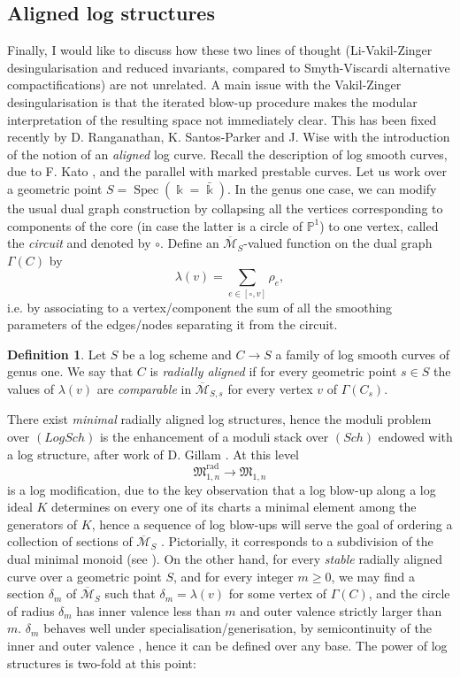 \documentclass[11pt]{amsart}
\newcommand{\oM}{\overline{\mathcal{M}}}
\newcommand{\PP}{\mathbb P}
\renewcommand{\to}{\rightarrow}
\newcommand{\MM}{\mathfrak M}
\newcommand{\kk}{\Bbbk}
\newcommand{\Spec}{\operatorname{Spec}}
\theoremstyle{definition}
\theoremstyle{definition}
\newtheorem{dfn}[thm]{Definition}
\begin{document}
\subsection{Aligned log structures} Finally, I would like to discuss how these two lines of thought (Li-Vakil-Zinger desingularisation and reduced invariants, compared to Smyth-Viscardi alternative compactifications) are not unrelated. A main issue with the Vakil-Zinger desingularisation is that the iterated blow-up procedure makes the modular interpretation of the resulting space not immediately clear. This has been fixed recently by D. Ranganathan, K. Santos-Parker and J. Wise with the introduction of the notion of an \emph{aligned} log curve. Recall the description of log smooth curves, due to F. Kato \cite{KatoF}, and the parallel with marked prestable curves. Let us work over a geometric point $S=\Spec(\kk=\bar\kk)$. In the genus one case, we can modify the usual dual graph construction by collapsing all the vertices corresponding to components of the core (in case the latter is a circle of $\PP^1$) to one vertex, called the \emph{circuit} and denoted by $\circ$. Define an $\oM_S$-valued function on the dual graph $\Gamma(C)$ by \[\lambda(v)=\sum_{e\in[\circ,v]}\rho_e,\] i.e. by associating to a vertex/component the sum of all the smoothing parameters of the edges/nodes separating it from the circuit.
\begin{dfn}
 Let $S$ be a log scheme and $C\to S$ a family of log smooth curves of genus one. We say that $C$ is \emph{radially aligned} if for every geometric point $s\in S$ the values of $\lambda(v)$ are \emph{comparable} in $\oM_{S,s}$ for every vertex $v$ of $\Gamma(C_s)$.
\end{dfn}
There exist \emph{minimal} radially aligned log structures, hence the moduli problem over $(LogSch)$ is the enhancement of a moduli stack over $(Sch)$ endowed with a log structure, after work of D. Gillam \cite{Gillam}. At this level
\[\MM^{\mathrm{rad}}_{1,n}\to\MM_{1,n}\]
is a log modification, due to the key observation that a log blow-up along a log ideal $K$ determines on every one of its charts a minimal element among the generators of $K$, hence a sequence of log blow-ups will serve the goal of ordering a collection of sections of $\oM_S$ \cite[Lemma 3.36]{Kelithesis}. Pictorially, it corresponds to a subdivision of the dual minimal monoid (see \cite[\S 3.3-3.4]{RSPW}). On the other hand, for every \emph{stable} radially aligned curve over a geometric point $S$, and for every integer $m\geq0$, we may find a section $\delta_m$ of $\oM_S$ such that $\delta_m=\lambda(v)$ for some vertex of $\Gamma(C)$, and the circle of radius $\delta_m$ has inner valence less than $m$ and outer valence strictly larger than $m$. $\delta_m$ behaves well under specialisation/generisation, by semicontinuity of the inner and outer valence \cite[Proposition 3.5.2]{RSPW}, hence it can be defined over any base. The power of log structures is two-fold at this point:
\end{document}

